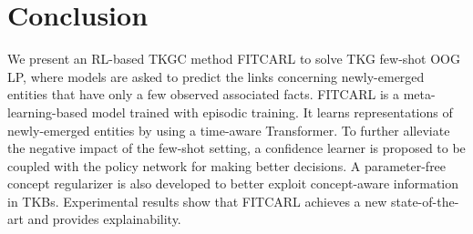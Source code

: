 \documentclass[runningheads]{llncs}
\begin{document}
\section{Conclusion}
We present an RL-based TKGC method FITCARL to solve TKG few-shot OOG LP, where models are asked to predict the links concerning newly-emerged entities that have only a few observed associated facts. FITCARL is a meta-learning-based model trained with episodic training. It learns representations of newly-emerged entities by using a time-aware Transformer. To further alleviate the negative impact of the few-shot setting, a confidence learner is proposed to be coupled with the policy network for making better decisions. A parameter-free concept regularizer is also developed to better exploit concept-aware information in TKBs. Experimental results show that FITCARL achieves a new state-of-the-art and provides explainability.
\end{document}
